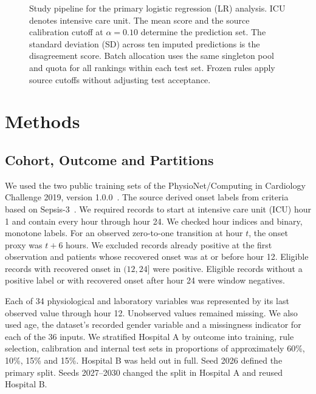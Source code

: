 \documentclass[conference]{IEEEtran}
\begin{document}
\begin{figure}[t]
\caption{Study pipeline for the primary logistic regression (LR) analysis. ICU denotes intensive care unit. The mean score and the source calibration cutoff at $\alpha = 0.10$ determine the prediction set. The standard deviation (SD) across ten imputed predictions is the disagreement score. Batch allocation uses the same singleton pool and quota for all rankings within each test set. Frozen rules apply source cutoffs without adjusting test acceptance.}
\label{fig:pipeline}
\end{figure}

\section{Methods}

\subsection{Cohort, Outcome and Partitions}

We used the two public training sets of the PhysioNet/Computing in Cardiology Challenge 2019, version 1.0.0~\cite{reyna2019data,pollard2026}. The source derived onset labels from criteria based on Sepsis-3~\cite{reyna2020,singer2016}. We required records to start at intensive care unit (ICU) hour 1 and contain every hour through hour 24. We checked hour indices and binary, monotone labels. For an observed zero-to-one transition at hour $t$, the onset proxy was $t+6$ hours. We excluded records already positive at the first observation and patients whose recovered onset was at or before hour 12. Eligible records with recovered onset in $(12, 24]$ were positive. Eligible records without a positive label or with recovered onset after hour 24 were window negatives.

Each of 34 physiological and laboratory variables was represented by its last observed value through hour 12. Unobserved values remained missing. We also used age, the dataset's recorded gender variable and a missingness indicator for each of the 36 inputs. We stratified Hospital A by outcome into training, rule selection, calibration and internal test sets in proportions of approximately 60\%, 10\%, 15\% and 15\%. Hospital B was held out in full. Seed 2026 defined the primary split. Seeds 2027--2030 changed the split in Hospital A and reused Hospital B.
\end{document}
